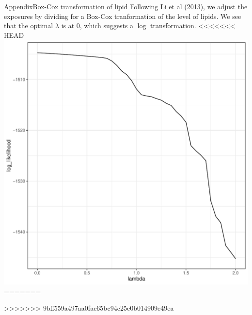 \documentclass{beamer}\usepackage[]{graphicx}\usepackage[]{color}
\makeatletter
\def\maxwidth{ %
  \ifdim\Gin@nat@width>\linewidth
    \linewidth
  \else
    \Gin@nat@width
  \fi
}
\newenvironment{kframe}{%
 \def\at@end@of@kframe{}%
 \ifinner\ifhmode%
  \def\at@end@of@kframe{\end{minipage}}%
  \begin{minipage}{\columnwidth}%
 \fi\fi%
 \def\FrameCommand##1{\hskip\@totalleftmargin \hskip-\fboxsep
 \colorbox{shadecolor}{##1}\hskip-\fboxsep
     \hskip-\linewidth \hskip-\@totalleftmargin \hskip\columnwidth}%
 \MakeFramed {\advance\hsize-\width
   \@totalleftmargin\z@ \linewidth\hsize
   \@setminipage}}%
 {\par\unskip\endMakeFramed%
 \at@end@of@kframe}
\newenvironment{knitrout}{}{} %
\makeatother
\begin{document}
\begin{frame}{Appendix}{Box-Cox transformation of lipid}
Following Li et al (2013), we adjust the exposures by dividing for a Box-Cox tranformation of the level of lipids. We see that the optimal $\lambda$ is at 0, which suggests a $\log$ transformation. 
\begin{knitrout}
<<<<<<< HEAD
\color{fgcolor}
\includegraphics[width=\maxwidth]{figure/unnamed-chunk-6-1} 
=======
\color{fgcolor}\begin{kframe}
>>>>>>> 9bff559a497aa0fac65bc94c25e0b014909e49ea


{\ttfamily\noindent\bfseries\color{errorcolor}{\#\# Error in eval(lhs, parent, parent): object 'd' not found}}

{\ttfamily\noindent\bfseries\color{errorcolor}{\#\# Error in eval(expr, envir, enclos): object 'd' not found}}


\end{kframe}
\end{knitrout}
\end{frame}
\end{document}
